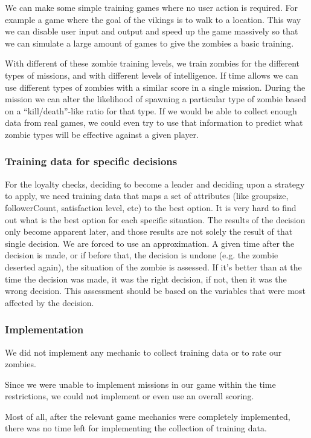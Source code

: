 We can make some simple training games where no user action is required. For example a game where the goal of the vikings is to walk to a location. This way we can disable user input and output and speed up the game massively so that we can simulate a large amount of games to give the zombies a basic training.

With different of these zombie training levels, we train zombies for the different types of missions, and with different levels of intelligence. If time allows we can use different types of zombies with a similar score in a single mission. During the mission we can alter the likelihood of spawning a particular type of zombie based on a ``kill/death''-like ratio for that type. If we would be able to collect enough data from real games, we could even try to use that information to predict what zombie types will be effective against a given player.

\subsubsection{Training data for specific decisions}
For the loyalty checks, deciding to become a leader and deciding upon a strategy to apply, we need training data that maps a set of attributes (like groupsize, followerCount, satisfaction level, etc) to the best option. It is very hard to find out what is the best option for each specific situation. The results of the decision only become apparent later, and those results are not solely the result of that single decision. We are forced to use an approximation. A given time after the decision is made, or if before that, the decision is undone (e.g. the zombie deserted again), the situation of the zombie is assessed. If it's better than at the time the decision was made, it was the right decision, if not, then it was the wrong decision. This assessment should be based on the variables that were most affected by the decision.

\subsubsection{Implementation}
We did not implement any mechanic to collect training data or to rate our zombies.

Since we were unable to implement missions in our game within the time restrictions, we could not implement or even use an overall scoring.

Most of all, after the relevant game mechanics were completely implemented, there was no time left for implementing the collection of training data.

\FloatBarrier